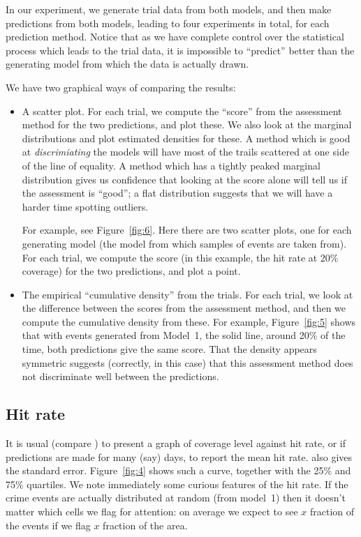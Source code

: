 \documentclass[twoside,a4paper,twocolumn,10pt]{article}
\theoremstyle{plain}
\theoremstyle{definition}
\begin{document}
In our experiment, we generate trial data from both models, and then make predictions
from both models, leading to four experiments in total, for each prediction method.
Notice that as we have complete control over the statistical process which leads to
the trial data, it is impossible to ``predict'' better than the generating model from
which the data is actually drawn.

We have two graphical ways of comparing the results:
\begin{itemize}
\item A scatter plot.  For each trial, we compute the ``score'' from the assessment
  method for the two predictions, and plot these.  We also look at the marginal
  distributions and plot estimated densities for these.  A method which is good at
  \emph{discrimiating} the models will have most of the trails scattered at one side
  of the line of equality.  A method which has a tightly peaked marginal distribution
  gives us confidence that looking at the score alone will tell us if the assessment
  is ``good''; a flat distribution suggests that we will have a harder time spotting
  outliers.
  
  For example, see Figure~\ref{fig:6}.  Here there are two scatter plots, one for each
  generating model (the model from which samples of events are taken from).  For each
  trial, we compute the score (in this example, the hit rate at 20\% coverage) for the
  two predictions, and plot a point.

\item The empirical ``cumulative density'' from the trials.  For each trial, we look at
  the difference between the scores from the assessment method, and then we compute the
  cumulative density from these.  For example, Figure~\ref{fig:5} shows that with
  events generated from Model~1, the solid line, around 20\% of the time,
  both predictions give the same score.  That the density appears symmetric suggests
  (correctly, in this case) that this assessment method does not discriminate well between
  the predictions.
\end{itemize}




\subsection{Hit rate}\label{sec:hit_rate_art}

It is usual (compare \cite{arc, rdbjc, sepp}) to present a graph of coverage level
against hit rate, or if predictions are made for many (say) days, to report the mean hit
rate.  \cite{sepp} also gives the standard error.  Figure~\ref{fig:4} shows such a curve,
together with the 25\% and 75\% quartiles.   We note immediately some curious features of
the hit rate.  If the crime events are actually distributed at random (from model~1) then it
doesn't matter which cells we flag for attention: on average we expect to see $x$ fraction of
the events if we flag $x$ fraction of the area.
\end{document}
